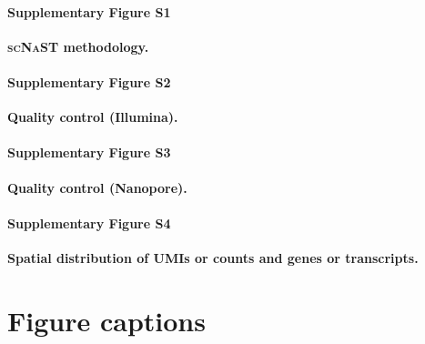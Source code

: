 \documentclass[utf8]{FrontiersinHarvard} %
\newcommand{\scnast}{\textsc{scNaST}\xspace}
\begin{document}
\paragraph*{Supplementary Figure S1}
\label{fig:S1}
{\bf \scnast methodology.}

\paragraph*{Supplementary Figure S2}
\label{fig:S2}
{\bf Quality control (Illumina).}

\paragraph*{Supplementary Figure S3}
\label{fig:S3}
{\bf Quality control (Nanopore).}

\paragraph*{Supplementary Figure S4}
\label{fig:S4}
{\bf Spatial distribution of UMIs or counts and genes or transcripts.}



%




\section*{Figure captions}
\end{document}
